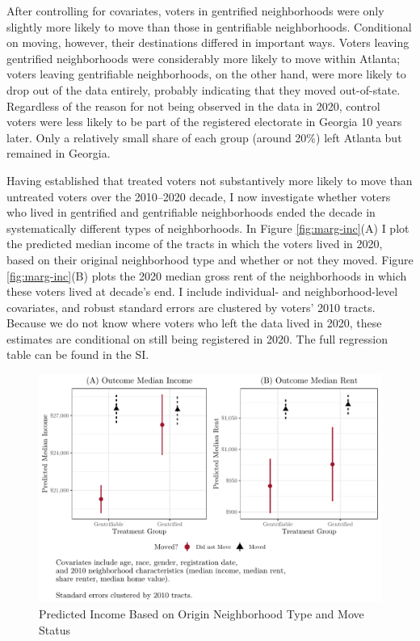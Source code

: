 \documentclass[
  12pt,
]{article}
\begin{document}
After controlling for covariates, voters in gentrified neighborhoods were only slightly more likely to move than those in gentrifiable neighborhoods. Conditional on moving, however, their destinations differed in important ways. Voters leaving gentrified neighborhoods were considerably more likely to move within Atlanta; voters leaving gentrifiable neighborhoods, on the other hand, were more likely to drop out of the data entirely, probably indicating that they moved out-of-state. Regardless of the reason for not being observed in the data in 2020, control voters were less likely to be part of the registered electorate in Georgia 10 years later. Only a relatively small share of each group (around 20\%) left Atlanta but remained in Georgia.

Having established that treated voters not substantively more likely to move than untreated voters over the 2010--2020 decade, I now investigate whether voters who lived in gentrified and gentrifiable neighborhoods ended the decade in systematically different types of neighborhoods. In Figure \ref{fig:marg-inc}(A) I plot the predicted median income of the tracts in which the voters lived in 2020, based on their original neighborhood type and whether or not they moved. Figure \ref{fig:marg-inc}(B) plots the 2020 median gross rent of the neighborhoods in which these voters lived at decade's end. I include individual- and neighborhood-level covariates, and robust standard errors are clustered by voters' 2010 tracts. Because we do not know where voters who left the data lived in 2020, these estimates are conditional on still being registered in 2020. The full regression table can be found in the SI.

\begin{figure}[H]

{\centering \includegraphics{gentrification_files/figure-latex/move-inc-1} 

}

\caption{\label{fig:marg-inc}Predicted Income Based on Origin Neighborhood Type and Move Status}\label{fig:move-inc}
\end{figure}
\end{document}
